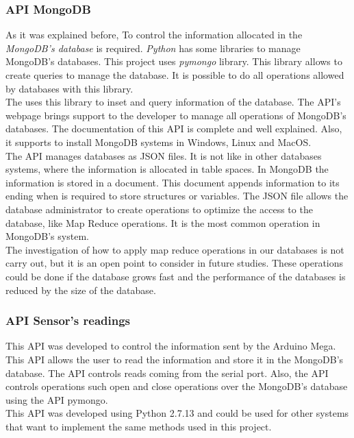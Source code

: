 \subsubsection{API MongoDB}

As it was explained before, To control the information allocated in the \textit{MongoDB's database} is required. \textit{Python} has some libraries to manage MongoDB's databases. This project uses \textit{pymongo} library. This library allows to create queries to manage the database. It is possible to do all operations allowed by databases with this library.\\

The uses this library to inset and query information of the database. The API's webpage brings support to the developer to manage all operations of MongoDB's databases. The documentation of this API is complete and well explained. Also, it supports to install MongoDB systems in Windows, Linux and MacOS.\\

The API manages databases as JSON files. It is not like in other databases systems, where the information is allocated in table spaces. In MongoDB the information is stored in a document. This document appends information to its ending when is required to store structures or variables. The JSON file allows the database administrator to create operations to optimize the access to the database, like Map Reduce operations. It is the most common operation in MongoDB's system.\\

The investigation of how to apply map reduce operations in our databases is not carry out, but it is an open point to consider in future studies. These operations could be done if the database grows fast and the performance of the databases is reduced by the size of the database.

\subsubsection{API Sensor's readings}

This API was developed to control the information sent by the Arduino Mega. This API allows the user to read the information and store it in the MongoDB's database. The API controls reads coming from the serial port. Also, the API controls operations such open and close operations over the MongoDB's database using the API pymongo.\\

This API was developed using Python 2.7.13 and could be used for other systems that want to implement the same methods used in this project.\\

